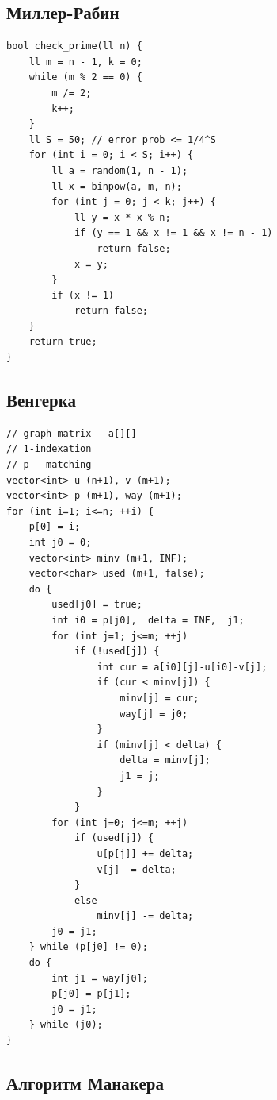 \documentclass[10pt, portrait,letterpaper]{article}
\begin{document}
\subsection{Миллер-Рабин}
\begin{verbatim}
bool check_prime(ll n) {
    ll m = n - 1, k = 0;
    while (m % 2 == 0) {
        m /= 2;
        k++;
    }
    ll S = 50; // error_prob <= 1/4^S
    for (int i = 0; i < S; i++) {
        ll a = random(1, n - 1);
        ll x = binpow(a, m, n);
        for (int j = 0; j < k; j++) {
            ll y = x * x % n;
            if (y == 1 && x != 1 && x != n - 1)
                return false;
            x = y;
        }
        if (x != 1)
            return false;
    }
    return true;
}
\end{verbatim}

\subsection{Венгерка}

\begin{verbatim}
// graph matrix - a[][]
// 1-indexation
// p - matching
vector<int> u (n+1), v (m+1);
vector<int> p (m+1), way (m+1);
for (int i=1; i<=n; ++i) {
    p[0] = i;
    int j0 = 0;
    vector<int> minv (m+1, INF);
    vector<char> used (m+1, false);
    do {
        used[j0] = true;
        int i0 = p[j0],  delta = INF,  j1;
        for (int j=1; j<=m; ++j)
            if (!used[j]) {
                int cur = a[i0][j]-u[i0]-v[j];
                if (cur < minv[j]) {
                    minv[j] = cur;
                    way[j] = j0;
                }
                if (minv[j] < delta) {
                    delta = minv[j];
                    j1 = j;
                }
            }
        for (int j=0; j<=m; ++j)
            if (used[j]) {
                u[p[j]] += delta;
                v[j] -= delta;
            }
            else
                minv[j] -= delta;
        j0 = j1;
    } while (p[j0] != 0);
    do {
        int j1 = way[j0];
        p[j0] = p[j1];
        j0 = j1;
    } while (j0);
}
\end{verbatim}

\subsection{Алгоритм Манакера}
\end{document}
